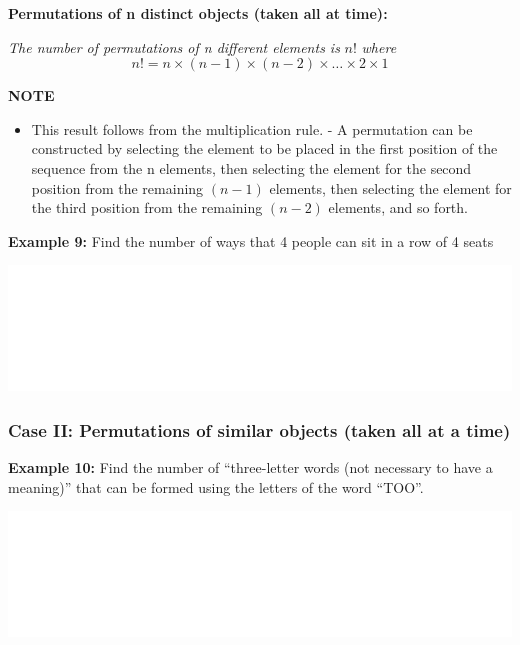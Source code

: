 \documentclass[]{book}
\providecommand{\tightlist}{%
  \setlength{\itemsep}{0pt}\setlength{\parskip}{0pt}}
\begin{document}
\textbf{Permutations of n distinct objects (taken all at time): }

\emph{The number of permutations of n different elements is} \(n!\) \emph{where}
\[n! = n \times (n-1)\times(n-2)\times \dots \times 2 \times1\]

\textbf{NOTE}

\begin{itemize}
\tightlist
\item
  This result follows from the multiplication rule. - A permutation can be constructed by selecting the element to be placed in the first position of the sequence from the n elements, then selecting the element for the second position from the remaining \((n-1)\) elements, then selecting the element for the third position from the remaining \((n-2)\) elements, and so forth.
\end{itemize}

\textbf{Example 9:} Find the number of ways that 4 people can sit in a row of 4 seats

\begin{center}\includegraphics[width=1\linewidth]{figure/box86-1} \end{center}

\hypertarget{case-ii-permutations-of-similar-objects-taken-all-at-a-time}{%
\subsubsection{Case II: Permutations of similar objects (taken all at a time)}\label{case-ii-permutations-of-similar-objects-taken-all-at-a-time}}

\textbf{Example 10:} Find the number of ``three-letter words (not necessary to have a meaning)'' that can be formed using the letters of the word ``TOO''.

\begin{center}\includegraphics[width=1\linewidth]{figure/box87-1} \end{center}
\end{document}
